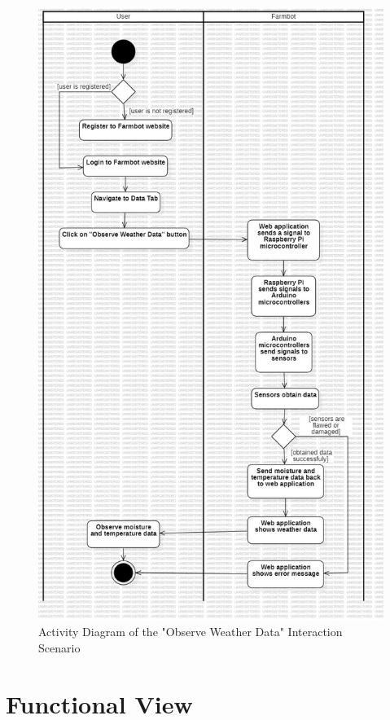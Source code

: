 \begin{figure}[htbp]
    \centering
    \includegraphics[scale=0.37]{Figures/activity2.jpg}
    \caption{Activity Diagram of the "Observe Weather Data" Interaction Scenario}
    \label{Activity2}
\end{figure}
\newpage

\section{Functional View}

